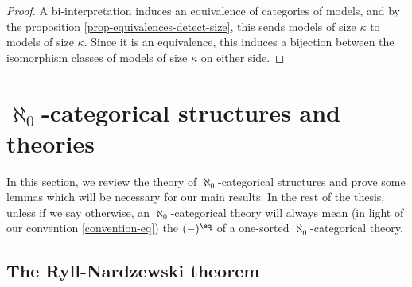 
%

\begin{proof}
A bi-interpretation induces an equivalence of categories of models, and by the proposition \ref{prop-equivalences-detect-size}, this sends models of size $\kappa$ to models of size $\kappa$. Since it is an equivalence, this induces a bijection between the isomorphism classes of models of size $\kappa$ on either side.
\end{proof}

\section{$\aleph_0$-categorical structures and theories}
In this section, we review the theory of $\aleph_0$-categorical structures and prove some lemmas which will be necessary for our main results. In the rest of the thesis, unless if we say otherwise, an $\aleph_0$-categorical theory will always mean (in light of our convention \ref{convention-eq}) the $(-)^{\eq}$ of a one-sorted $\aleph_0$-categorical theory.

\subsection{The Ryll-Nardzewski theorem}

